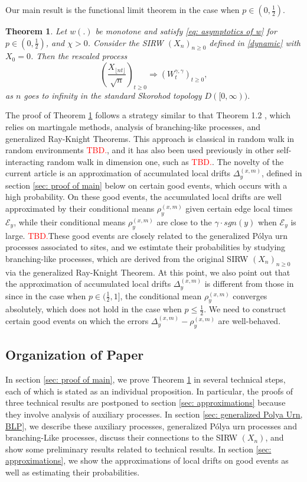 \documentclass[twoside,12pt,a4paper]{article}
\newtheorem{theorem}{Theorem}[section]
\numberwithin{equation}{section}
\newcommand\TBD{\textcolor{red}{TBD.}}
\begin{document}
Our main result is the functional limit theorem in the case when $p\in (0,\frac{1}{2})$.
\begin{theorem}\label{thm: main}
 Let $w(.)$ be monotone and satisfy \eqref{eq: asymptotics of w} for $p\in (0,\frac{1}{2})$, and $\mathcal{\chi} >0 $. Consider the SIRW $(X_n)_{n\geq 0}$ defined in \eqref{dynamic} with $X_0 =0$. Then the rescaled process
	 $$
	 \left(  \frac{X_{\lfloor nt \rfloor }}{\sqrt{n}}  \right)_{t\geq 0} \Longrightarrow \left( W^{\gamma,\gamma}_{t}\right)_{t\geq 0},
	 $$ as $n$ goes to infinity in the standard Skorohod topology $D([0,\infty) ).$
\end{theorem}
The proof of Theorem \ref{thm: main} follows a strategy similar to that Theorem 1.2 \cite{KMP22}, which relies on martingale methods, analysis of branching-like processes, and generalized Ray-Knight Theorems. This approach is classical in random walk in random environments \TBD, and it has also been used previously in other self-interacting random walk in dimension one, such as \TBD. The novelty of the current article is an approximation of accumulated local drifts $\Delta_y^{(x,m)}$, defined in section \ref{sec: proof of main} below on certain good events, which occurs with a high probability. On these good events, the accumulated local drifts are well approximated by their conditional means $\rho_{y}^{(x,m)}$ given certain edge local times $\mathcal{E}_y$, while their conditional means $\rho_{y}^{(x,m)}$ are close to the $\gamma \cdot sgn(y)$ when  $\mathcal{E}_y$ is large. \TBD These good events are closely related to the generalized P\'{o}lya  urn processes associated to sites, and we estimtate their probabilities by studying branching-like processes, which are derived from the original SIRW $(X_n)_{n\geq 0}$ via the generalized Ray-Knight Theorem. At this point, we also point out that the approximation of accumulated local drifts $\Delta_y^{(x,m)}$ is different from those in \cite{KMP22} since in the case when $p\in(\frac{1}{2},1]$, the conditional mean $\rho_{y}^{(x,m)}$ converges absolutely, which does not hold in the case when $p\leq \frac{1}{2}$. We need to construct certain good events on which the errors $\Delta_y^{(x,m)}- \rho_y^{(x,m)}$ are well-behaved.

\subsection{Organization of Paper}
In section \ref{sec: proof of main}, we prove Theorem \ref{thm: main} in several technical steps, each of which is stated as an individual proposition. In particular, the proofs of three technical results are postponed to section \ref{sec: approximations} because they involve analysis of auxiliary processes. In section \ref{sec: generalized Polya Urn, BLP}, we describe these auxiliary processes, generalized P\'{o}lya urn processes and branching-Like processes, discuss their connections to the SIRW $(X_n)$, and show some preliminary results related to technical results. In section \ref{sec: approximations}, we show the approximations of local drifts on good events as well as estimating their probabilities. 
\end{document}
